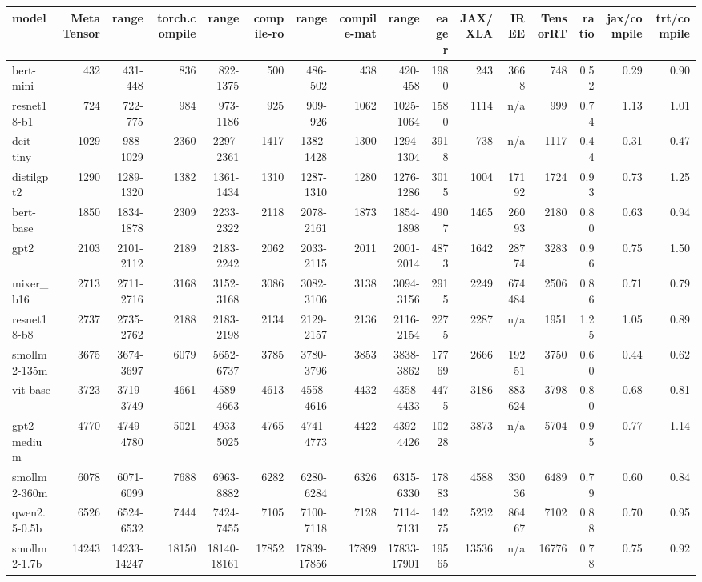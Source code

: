 \begin{tabular}{lrrrrrrrrrrrrrrr}
\toprule
model & MetaTensor & range & torch.compile & range & compile-ro & range & compile-mat & range & eager & JAX/XLA & IREE & TensorRT & ratio & jax/compile & trt/compile \\
\midrule
bert-mini & 432 & 431-448 & 836 & 822-1375 & 500 & 486-502 & 438 & 420-458 & 1980 & 243 & 3668 & 748 & 0.52 & 0.29 & 0.90 \\
resnet18-b1 & 724 & 722-775 & 984 & 973-1186 & 925 & 909-926 & 1062 & 1025-1064 & 1580 & 1114 & n/a & 999 & 0.74 & 1.13 & 1.01 \\
deit-tiny & 1029 & 988-1029 & 2360 & 2297-2361 & 1417 & 1382-1428 & 1300 & 1294-1304 & 3918 & 738 & n/a & 1117 & 0.44 & 0.31 & 0.47 \\
distilgpt2 & 1290 & 1289-1320 & 1382 & 1361-1434 & 1310 & 1287-1310 & 1280 & 1276-1286 & 3015 & 1004 & 17192 & 1724 & 0.93 & 0.73 & 1.25 \\
bert-base & 1850 & 1834-1878 & 2309 & 2233-2322 & 2118 & 2078-2161 & 1873 & 1854-1898 & 4907 & 1465 & 26093 & 2180 & 0.80 & 0.63 & 0.94 \\
gpt2 & 2103 & 2101-2112 & 2189 & 2183-2242 & 2062 & 2033-2115 & 2011 & 2001-2014 & 4873 & 1642 & 28774 & 3283 & 0.96 & 0.75 & 1.50 \\
mixer\_b16 & 2713 & 2711-2716 & 3168 & 3152-3168 & 3086 & 3082-3106 & 3138 & 3094-3156 & 2915 & 2249 & 674484 & 2506 & 0.86 & 0.71 & 0.79 \\
resnet18-b8 & 2737 & 2735-2762 & 2188 & 2183-2198 & 2134 & 2129-2157 & 2136 & 2116-2154 & 2275 & 2287 & n/a & 1951 & 1.25 & 1.05 & 0.89 \\
smollm2-135m & 3675 & 3674-3697 & 6079 & 5652-6737 & 3785 & 3780-3796 & 3853 & 3838-3862 & 17769 & 2666 & 19251 & 3750 & 0.60 & 0.44 & 0.62 \\
vit-base & 3723 & 3719-3749 & 4661 & 4589-4663 & 4613 & 4558-4616 & 4432 & 4358-4433 & 4475 & 3186 & 883624 & 3798 & 0.80 & 0.68 & 0.81 \\
gpt2-medium & 4770 & 4749-4780 & 5021 & 4933-5025 & 4765 & 4741-4773 & 4422 & 4392-4426 & 10228 & 3873 & n/a & 5704 & 0.95 & 0.77 & 1.14 \\
smollm2-360m & 6078 & 6071-6099 & 7688 & 6963-8882 & 6282 & 6280-6284 & 6326 & 6315-6330 & 17883 & 4588 & 33036 & 6489 & 0.79 & 0.60 & 0.84 \\
qwen2.5-0.5b & 6526 & 6524-6532 & 7444 & 7424-7455 & 7105 & 7100-7118 & 7128 & 7114-7131 & 14275 & 5232 & 86467 & 7102 & 0.88 & 0.70 & 0.95 \\
smollm2-1.7b & 14243 & 14233-14247 & 18150 & 18140-18161 & 17852 & 17839-17856 & 17899 & 17833-17901 & 19565 & 13536 & n/a & 16776 & 0.78 & 0.75 & 0.92 \\
\bottomrule
\end{tabular}
